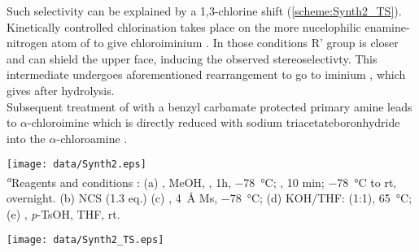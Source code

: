Such selectivity can be explained by a 1,3-chlorine shift \autocites{Metzger07}{Jorgensen11} (\ref{scheme:Synth2_TS}). Kinetically controlled chlorination takes place on the more nucelophilic enamine-nitrogen atom of  to give chloroiminium . In those conditions R' group is closer and can shield the upper face, inducing the observed stereoselectivty. This intermediate undergoes aforementioned rearrangement to go to iminium , which gives  after hydrolysis.\\
Subsequent treatment of  with a benzyl carbamate protected primary amine leads to $\alpha$-chloroimine which is directly reduced with sodium triacetateboronhydride into the $\alpha$-chloroamine .
\begin{figure''}
\centering
		\texttt{[image: data/Synth2.eps]}
    	\label{scheme:Synth2}
        \\
 \justify    \textsf{\scriptsize{\textsuperscript{\textit{a}}Reagents and conditions : (a) , MeOH, , 1h, \SI{-78}{\celsius}; , 10 min; \SI{-78}{\celsius} to rt, overnight. (b) NCS (1.3 eq.) (c) , \SI{4}{\angstrom} Ms, \SI{-78}{\celsius}; (d) KOH/THF: (1:1), \SI{65}{\celsius}; (e) , \textit{p}-TsOH, THF, rt.}}
 \vspace{4pt}
\end{figure''}
\vspace{-20pt}
\begin{figure''}
\centering
		\texttt{[image: data/Synth2\_TS.eps]}	
    \label{scheme:Synth2_TS}
\end{figure''}

